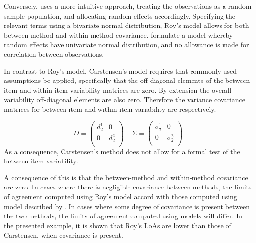 \documentclass[12pt, a4paper]{report}
\theoremstyle{plain}
\theoremstyle{definition}
\theoremstyle{remark}
\begin{document}
Conversely, \citet{ARoy2009} uses a more intuitive approach, treating the observations as a random sample population, and allocating random effects accordingly. Specifying the relevant terms using a bivariate normal distribution, Roy's model allows for both between-method and within-method covariance. \citet{BXC2008} formulate a model whereby random effects have univariate normal distribution, and no allowance is made for correlation between observations.
	
	In contrast to Roy's model, Carstensen's model requires that commonly used assumptions be applied, specifically that the off-diagonal elements of the between-item and within-item variability matrices are zero. By extension the overall variability off-diagonal elements are also zero. Therefore the variance covariance matrices for
	between-item and within-item variability are respectively.
	
	\[{D} = \left(
	\begin{array}{cc}
	d^1_2  & 0 \\
	0 & d^2_2 \\
	\end{array}
	\right) \;\;\;\; {\Sigma} = \left(
	\begin{array}{cc}
	\sigma^1_2  & 0 \\
	0 & \sigma^2_2 \\
	\end{array}
	\right) \]
	As a consequence, Carstensen's method does not allow for a formal test of the between-item variability.
	
	
	

	
A consequence of this is that the between-method and within-method covariance are zero. In cases where there is negligible covariance between methods, the limits of agreement computed using Roy's model accord with those computed using model described by \citet{BXC2008}.  In cases where some degree of covariance is present between the two methods, the limits of agreement computed using models will differ. In the presented example, it is shown that Roy's LoAs are lower than those of Carstensen, when covariance is present.
	
\end{document}
